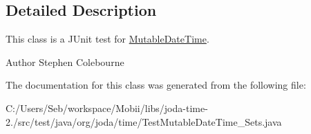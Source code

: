 \subsection{Detailed Description}
This class is a J\-Unit test for \hyperlink{classorg_1_1joda_1_1time_1_1_mutable_date_time}{Mutable\-Date\-Time}.

\begin{DoxyAuthor}{Author}
Stephen Colebourne 
\end{DoxyAuthor}


The documentation for this class was generated from the following file\-:\begin{DoxyCompactItemize}
\item 
C\-:/\-Users/\-Seb/workspace/\-Mobii/libs/joda-\/time-\/2./src/test/java/org/joda/time/Test\-Mutable\-Date\-Time\-\_\-\-Sets.\-java\end{DoxyCompactItemize}
